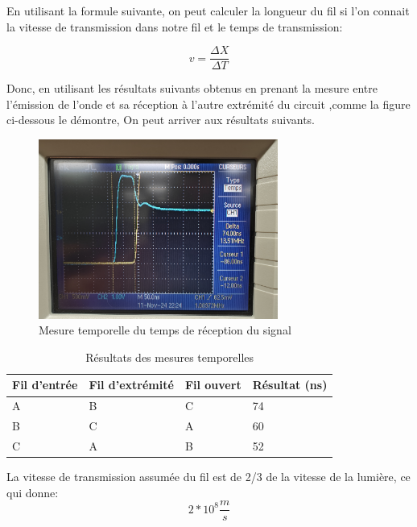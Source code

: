 
 En utilisant la formule suivante, on peut calculer la longueur du fil si l'on connait la vitesse de transmission dans notre fil et le temps de transmission:
 
 \begin{equation}
 v = \frac{\Delta X }{\Delta T} \label{eq:equation-vitesse}
 \end{equation}
 
 Donc, en utilisant les résultats suivants obtenus en prenant la mesure entre l'émission de l'onde et sa réception à l'autre extrémité du circuit
 ,comme la figure ci-dessous le démontre, On peut arriver aux résultats suivants.

 \begin{figure}[H]
    \centering
    \includegraphics[width=0.7\textwidth]{images/a-b-temporel.jpg}
    \caption{Mesure temporelle du temps de réception du signal}
    \label{fig:Signal à 1MHz}
 \end{figure}


 \begin{center}
 \begin{table}[H]
 \caption{Résultats des mesures temporelles} \label{tab:tableau mesures temporel}
 \begin{tabularx}{\textwidth}{ X X X X }
    Fil d'entrée & Fil d'extrémité & Fil ouvert & Résultat (ns) \\
    \hline
    \hline
     A & B & C & 74\\
     B & C & A & 60\\
     C & A & B & 52\\
     \hline
 \end{tabularx}
 \end{table}
 \end{center}


 La vitesse de transmission assumée du fil est de 2/3 de la vitesse de la lumière, ce qui donne: 
 \begin{equation}
    2*10^8 \frac{m}{s}
    \label{vitesse-transmission}
\end{equation}

